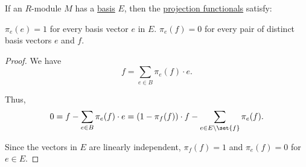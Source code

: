\begin{proposition}\label{thm:basis_projection_orthonormal}
  If an \( R \)-module \( M \) has a \hyperref[def:hamel_basis]{basis} \( E \), then the \hyperref[def:basis_decomposition]{projection functionals} satisfy:
  \begin{thmenum}
     \( \pi_e(e) = 1 \) for every basis vector \( e \) in \( E \).
     \( \pi_e(f) = 0 \) for every pair of distinct basis vectors \( e \) and \( f \).
  \end{thmenum}
\end{proposition}
\begin{proof}
  We have
  \begin{equation*}
    f = \sum_{e \in B} \pi_e(f) \cdot e.
  \end{equation*}

  Thus,
  \begin{equation*}
    0 = f - \sum_{e \in B} \pi_e(f) \cdot e = (1 - \pi_f(f)) \cdot f - \sum_{e \in E \setminus \set{ f }} \pi_e(f).
  \end{equation*}

  Since the vectors in \( E \) are linearly independent, \( \pi_f(f) = 1 \) and \( \pi_e(f) = 0 \) for \( e \in E \).
\end{proof}

